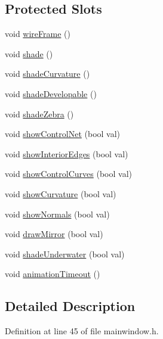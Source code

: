 \subsection*{Protected Slots}
\begin{DoxyCompactItemize}
\item 
void \hyperlink{classMainWindow_a8690702fe505fb6786ae98f9cad71118}{wire\-Frame} ()
\item 
void \hyperlink{classMainWindow_ad2040b40c2d18b4dea61d33699ae0a90}{shade} ()
\item 
void \hyperlink{classMainWindow_af7f1931b45432a43105345f806097501}{shade\-Curvature} ()
\item 
void \hyperlink{classMainWindow_a7827c32592a7991f37e87f2ba94b3ccd}{shade\-Developable} ()
\item 
void \hyperlink{classMainWindow_afc072912649b8cc513963db3b2f05283}{shade\-Zebra} ()
\item 
void \hyperlink{classMainWindow_a93b8868bdce207842de4747008f5e03e}{show\-Control\-Net} (bool val)
\item 
void \hyperlink{classMainWindow_aa0401a2a6241ff56390b1825f4e0e508}{show\-Interior\-Edges} (bool val)
\item 
void \hyperlink{classMainWindow_ac7ec359ed2a0f3c66ba5d2a788613832}{show\-Control\-Curves} (bool val)
\item 
void \hyperlink{classMainWindow_a65462f395b206a9a680a5521082b6344}{show\-Curvature} (bool val)
\item 
void \hyperlink{classMainWindow_a8edd7fa619d2ed66b94f6a498f5af59c}{show\-Normals} (bool val)
\item 
void \hyperlink{classMainWindow_afb7953f1fdcb7c5a77efa6fb4d2c3cd5}{draw\-Mirror} (bool val)
\item 
void \hyperlink{classMainWindow_adecb2e29c0d3df68517a570dc9e352bd}{shade\-Underwater} (bool val)
\item 
void \hyperlink{classMainWindow_a4a399825baba544bf4850e06e5e1fa94}{animation\-Timeout} ()
\end{DoxyCompactItemize}


\subsection{Detailed Description}


Definition at line 45 of file mainwindow.\-h.



